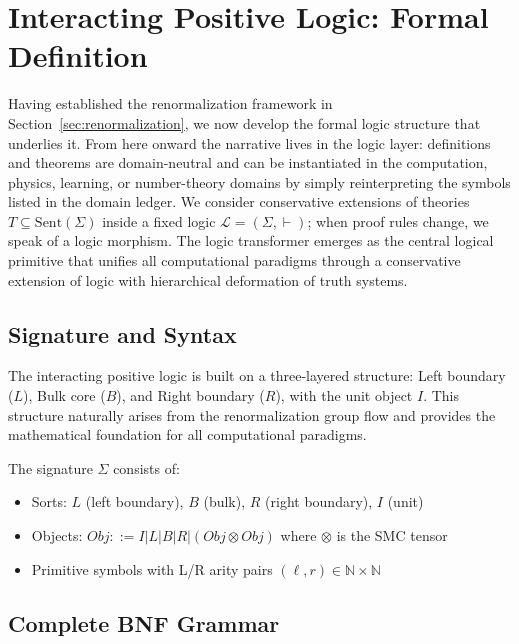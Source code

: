 \section{Interacting Positive Logic: Formal Definition}
\label{sec:formal-systems}

Having established the renormalization framework in Section~\ref{sec:renormalization}, we now develop the formal logic structure that underlies it. From here onward the narrative lives in the logic layer: definitions and theorems are domain-neutral and can be instantiated in the computation, physics, learning, or number-theory domains by simply reinterpreting the symbols listed in the domain ledger. We consider conservative extensions of theories $T\subseteq\mathrm{Sent}(\Sigma)$ inside a fixed logic $\mathcal{L}=(\Sigma,\vdash)$; when proof rules change, we speak of a logic morphism. The logic transformer emerges as the central logical primitive that unifies all computational paradigms through a conservative extension of logic with hierarchical deformation of truth systems.

\subsection{Signature and Syntax}

The interacting positive logic is built on a three-layered structure: Left boundary ($L$), Bulk core ($B$), and Right boundary ($R$), with the unit object $I$. This structure naturally arises from the renormalization group flow and provides the mathematical foundation for all computational paradigms.

\begin{definition}
\label{def:logic-signature}
The signature $\Sigma$ consists of:
\begin{itemize}
\item Sorts: $L$ (left boundary), $B$ (bulk), $R$ (right boundary), $I$ (unit)
\item Objects: $Obj ::= I | L | B | R | (Obj \otimes Obj)$ where $\otimes$ is the SMC tensor
\item Primitive symbols with L/R arity pairs $(\ell,r) \in \mathbb{N} \times \mathbb{N}$
\end{itemize}
\end{definition}

\subsection{Complete BNF Grammar}

